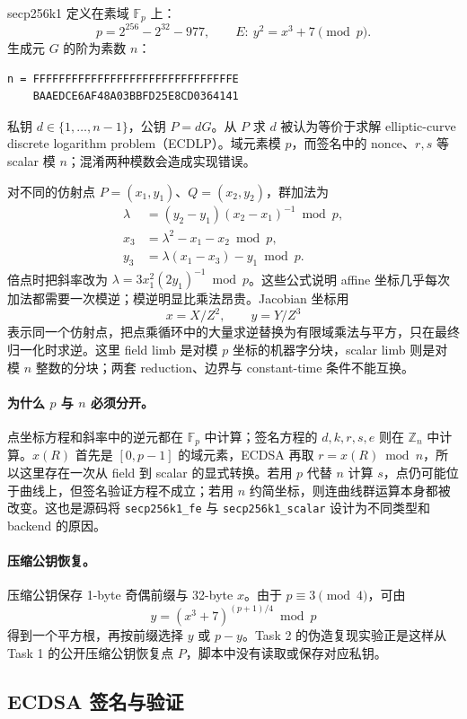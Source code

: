 \documentclass[11pt,a4paper,fontset=none]{ctexart}
\begin{document}
secp256k1 定义在素域 $\mathbb{F}_p$ 上：
\[
p=2^{256}-2^{32}-977,
\qquad E:\ y^2=x^3+7\pmod p.
\]
生成元 $G$ 的阶为素数 $n$：
\begin{lstlisting}[language={}]
n = FFFFFFFFFFFFFFFFFFFFFFFFFFFFFFFE
    BAAEDCE6AF48A03BBFD25E8CD0364141
\end{lstlisting}
私钥 $d\in\{1,\ldots,n-1\}$，公钥 $P=dG$。从 $P$ 求 $d$ 被认为等价于求解 elliptic-curve discrete logarithm problem（ECDLP）。域元素模 $p$，而签名中的 nonce、$r,s$ 等 scalar 模 $n$；混淆两种模数会造成实现错误。

对不同的仿射点 $P=(x_1,y_1)$、$Q=(x_2,y_2)$，群加法为
\begin{align*}
\lambda&=(y_2-y_1)(x_2-x_1)^{-1}\bmod p,\\
x_3&=\lambda^2-x_1-x_2\bmod p,\\
y_3&=\lambda(x_1-x_3)-y_1\bmod p.
\end{align*}
倍点时把斜率改为 $\lambda=3x_1^2(2y_1)^{-1}\bmod p$。这些公式说明 affine 坐标几乎每次加法都需要一次模逆；模逆明显比乘法昂贵。Jacobian 坐标用
\[
x=X/Z^2,\qquad y=Y/Z^3
\]
表示同一个仿射点，把点乘循环中的大量求逆替换为有限域乘法与平方，只在最终归一化时求逆。这里 field limb 是对模 $p$ 坐标的机器字分块，scalar limb 则是对模 $n$ 整数的分块；两套 reduction、边界与 constant-time 条件不能互换。

\paragraph{为什么 $p$ 与 $n$ 必须分开。}
点坐标方程和斜率中的逆元都在 $\mathbb{F}_p$ 中计算；签名方程的 $d,k,r,s,e$ 则在 $\mathbb{Z}_n$ 中计算。$x(R)$ 首先是 $[0,p-1]$ 的域元素，ECDSA 再取 $r=x(R)\bmod n$，所以这里存在一次从 field 到 scalar 的显式转换。若用 $p$ 代替 $n$ 计算 $s$，点仍可能位于曲线上，但签名验证方程不成立；若用 $n$ 约简坐标，则连曲线群运算本身都被改变。这也是源码将 \texttt{secp256k1\_fe} 与 \texttt{secp256k1\_scalar} 设计为不同类型和 backend 的原因。

\paragraph{压缩公钥恢复。}
压缩公钥保存 1-byte 奇偶前缀与 32-byte $x$。由于 $p\equiv3\pmod4$，可由
\[
y=\left(x^3+7\right)^{(p+1)/4}\bmod p
\]
得到一个平方根，再按前缀选择 $y$ 或 $p-y$。Task 2 的伪造复现实验正是这样从 Task 1 的公开压缩公钥恢复点 $P$，脚本中没有读取或保存对应私钥。

\subsection{ECDSA 签名与验证}
\end{document}
